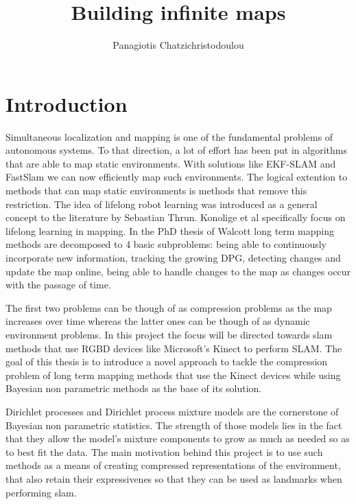 \documentclass[]{article}
\title{\vspace{-0.0cm}Building infinite maps}
\author{Panagiotis Chatzichristodoulou}
\date{}
\begin{document}
\maketitle %


\section{Introduction}

Simultaneous localization and mapping is one of the fundamental problems of autonomous systems\cite{probRobs}. To that direction, a lot of effort has been put in algorithms that are able to map static environments. With solutions like EKF-SLAM\cite{ekf} and FastSlam\cite{slam} we can now efficiently map such environments. 
The logical extention to methods that can map static environments is methods that remove this restriction. The idea of lifelong robot learning was introduced as a general concept to the literature by Sebastian Thrun\cite{liflonglearning}. Konolige et al\cite{lifelongmaps} specifically focus on lifelong learning in mapping. In the PhD thesis of Walcott\cite{aishalong} long term mapping methods are decomposed to 4 basic subproblems: being able to continuously incorporate new information, tracking the growing DPG, detecting changes and update the map online, being able to handle changes to the map as changes occur with the passage of time.

The first two problems can be though of as compression problems as the map increases over time whereas the latter ones can be though of as dynamic environment problems. In this project the focus will be directed towards slam methods that use RGBD devices like Microsoft's Kinect to perform SLAM. The goal of this thesis is to introduce a novel approach to tackle the compression problem of long term mapping methods that use the Kinect devices while using Bayesian non parametric methods as the base of its solution.

Dirichlet processes and Dirichlet process mixture models\cite{nonParam} are the cornerstone of Bayesian non parametric statistics. The strength of those models lies in the fact that they allow the model's mixture components to grow as much as needed so as to best fit the data. The main motivation behind this project is to use such methods as a means of creating compressed representations of the environment, that also retain their expressivenes so that they can be used as landmarks when performing slam.
\end{document}
